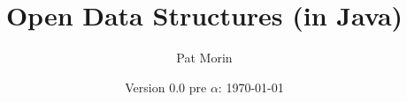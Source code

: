 \documentclass[11pt]{book}
\title{Open Data Structures (in Java)}
\author{Pat Morin}
\date{Version 0.0 pre $\alpha$: \today}
\begin{document}
\begin{titlepage}
  \maketitle
\end{titlepage}

\ \thispagestyle{empty}\newpage

\setcounter{page}{1}


\tableofcontents

















\end{document}
